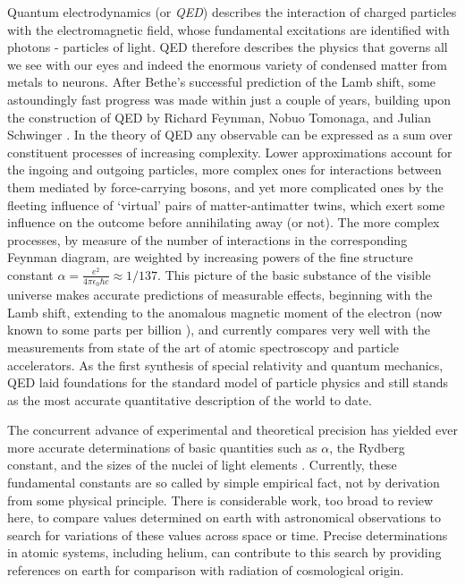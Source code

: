 	Quantum electrodynamics (or \emph{QED}) describes the interaction of charged particles with the electromagnetic field, whose fundamental excitations are identified with photons - particles of light.
	QED therefore describes the physics that governs all we see with our eyes and indeed the enormous variety of condensed matter from metals to neurons.
	After Bethe's successful prediction of the Lamb shift, some astoundingly fast progress was made within just a couple of years, building upon the construction of QED by Richard Feynman, Nobuo Tomonaga, and Julian Schwinger \cite{FeynmanNobel}.
	In the theory of QED any observable can be expressed as a sum over constituent processes of increasing complexity.
	Lower approximations account for the ingoing and outgoing particles, more complex ones for interactions between them mediated by force-carrying bosons, and yet more complicated ones by the fleeting influence of `virtual' pairs of matter-antimatter twins, which exert some influence on the outcome before annihilating away (or not).
	The more complex processes, by measure of the number of interactions in the corresponding Feynman diagram, are weighted by increasing powers of the fine structure constant $\alpha=\frac{e^2}{4\pi\epsilon_0\hbar c}\approx1/137$.
	This picture of the basic substance of the visible universe makes accurate predictions of measurable effects, beginning with the Lamb shift, extending to the anomalous magnetic moment of the electron (now known to some parts per billion \cite{Aoyama15,Hanneke08}), and currently compares very well with the measurements from state of the art of atomic spectroscopy and particle accelerators.
	As the first synthesis of special relativity and quantum mechanics, QED laid foundations for the standard model of particle physics and still stands as the most accurate quantitative description of the world to date. 

	The concurrent advance of experimental and theoretical precision has yielded ever more accurate determinations of basic quantities such as $\alpha$, the Rydberg constant, and the sizes of the nuclei of light elements \cite{NIST_Constants}. 
	Currently, these fundamental constants are so called by simple empirical fact, not by derivation from some physical principle.
	There is considerable work, too broad to review here, to compare values determined on earth with astronomical observations to search for variations of these values across space or time.
	Precise determinations in atomic systems, including helium, can contribute to this search by providing references on earth for comparison with radiation of cosmological origin.

